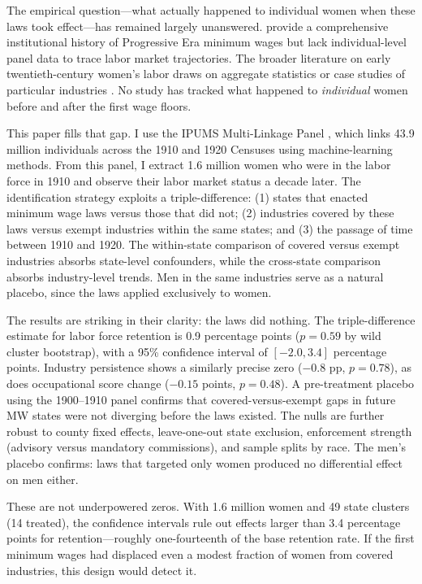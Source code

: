 \documentclass[12pt]{article}
\begin{document}
The empirical question---what actually happened to individual women when these laws took effect---has remained largely unanswered. \citet{seltzer2020} provide a comprehensive institutional history of Progressive Era minimum wages but lack individual-level panel data to trace labor market trajectories. The broader literature on early twentieth-century women's labor draws on aggregate statistics \citep{goldin1990understanding, goldin2006quiet} or case studies of particular industries \citep{tentler1979wage}. No study has tracked what happened to \textit{individual} women before and after the first wage floors.

This paper fills that gap. I use the IPUMS Multi-Linkage Panel \citep[MLP;][]{helgertz2023}, which links 43.9 million individuals across the 1910 and 1920 Censuses using machine-learning methods. From this panel, I extract 1.6 million women who were in the labor force in 1910 and observe their labor market status a decade later. The identification strategy exploits a triple-difference: (1) states that enacted minimum wage laws versus those that did not; (2) industries covered by these laws versus exempt industries within the same states; and (3) the passage of time between 1910 and 1920. The within-state comparison of covered versus exempt industries absorbs state-level confounders, while the cross-state comparison absorbs industry-level trends. Men in the same industries serve as a natural placebo, since the laws applied exclusively to women.

The results are striking in their clarity: the laws did nothing. The triple-difference estimate for labor force retention is 0.9 percentage points ($p = 0.59$ by wild cluster bootstrap), with a 95\% confidence interval of $[-2.0, 3.4]$ percentage points. Industry persistence shows a similarly precise zero ($-0.8$ pp, $p = 0.78$), as does occupational score change ($-0.15$ points, $p = 0.48$). A pre-treatment placebo using the 1900--1910 panel confirms that covered-versus-exempt gaps in future MW states were not diverging before the laws existed. The nulls are further robust to county fixed effects, leave-one-out state exclusion, enforcement strength (advisory versus mandatory commissions), and sample splits by race. The men's placebo confirms: laws that targeted only women produced no differential effect on men either.

These are not underpowered zeros. With 1.6 million women and 49 state clusters (14 treated), the confidence intervals rule out effects larger than 3.4 percentage points for retention---roughly one-fourteenth of the base retention rate. If the first minimum wages had displaced even a modest fraction of women from covered industries, this design would detect it.
\end{document}
